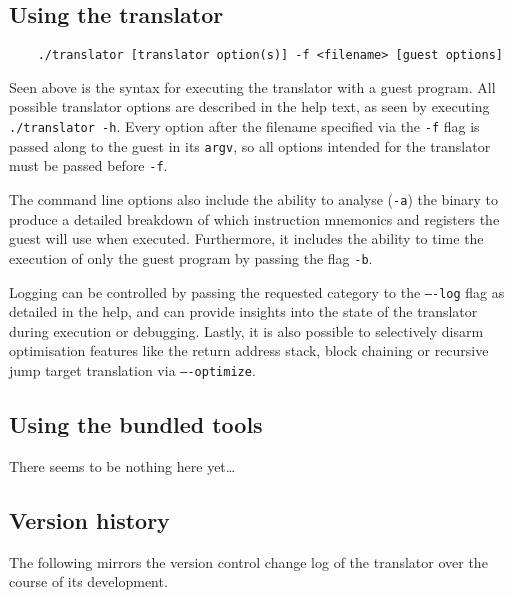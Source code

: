 \subsection{Using the translator}
\label{sec:translator-usage}
\begin{lstlisting}
	./translator [translator option(s)] -f <filename> [guest options]
\end{lstlisting}

Seen above is the syntax for executing the translator with a guest program.
All possible translator options are described in the help text, as seen by executing \texttt{./translator -h}.
Every option after the filename specified via the \texttt{-f} flag is passed along to the guest in its \texttt{argv}, so all options intended for the translator must be passed before \texttt{-f}.

The command line options also include the ability to analyse (\texttt{-a}) the binary to produce a detailed breakdown of which instruction mnemonics and registers the guest will use when executed.
Furthermore, it includes the ability to time the execution of only the guest program by passing the flag \texttt{-b}.

Logging can be controlled by passing the requested category to the \texttt{----log} flag as detailed in the help, and can provide insights into the state of the translator during execution or debugging.
Lastly, it is also possible to selectively disarm optimisation features like the return address stack, block chaining or recursive jump target translation via \texttt{----optimize}.


\subsection{Using the bundled tools}
\label{sec:appendix-tools}
There seems to be nothing here yet\ldots


\subsection{Version history}
The following mirrors the version control change log of the translator over the course of its development.

